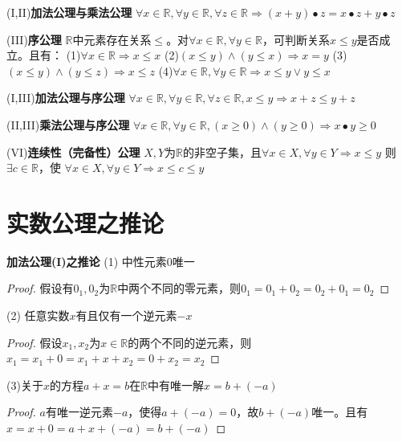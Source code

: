 \documentclass[11pt]{article}
\begin{document}
(I,II)\textbf{加法公理与乘法公理} \newline
$\forall x \in \mathbb{R}, \forall y \in \mathbb{R}, \forall z \in\mathbb{R} \Rightarrow (x+y) \bullet z=x \bullet z+y \bullet z$ \newline

(III)\textbf{序公理} \newline
$\mathbb{R}$中元素存在关系$\le$。对$\forall x \in \mathbb{R}, \forall y \in \mathbb{R}$，可判断关系$x \le y$是否成立。且有：\newline
(1)$\forall x \in \mathbb{R} \Rightarrow x \le x$ \newline
(2)$(x \le y) \land (y \le x) \Rightarrow x=y$ \newline
(3)$(x \le y) \land (y \le z) \Rightarrow x \le z$ \newline
(4)$\forall x \in \mathbb{R}, \forall y \in \mathbb{R} \Rightarrow x \le y \lor y \le x$ \newline

(I,III)\textbf{加法公理与序公理} \newline
$\forall x \in \mathbb{R}, \forall y \in \mathbb{R}, \forall z \in \mathbb{R}, x \le y \Rightarrow x+z \le y+z$ \newline

(II,III)\textbf{乘法公理与序公理} \newline
$\forall x \in \mathbb{R}, \forall y \in \mathbb{R}, (x \ge 0) \land (y \ge 0) \Rightarrow x \bullet y \ge 0$ \newline

(VI)\textbf{连续性（完备性）公理} \newline
$X, Y$为$\mathbb{R}$的非空子集，且$\forall x \in X, \forall y \in Y \Rightarrow x \le y$
则$\exists c \in \mathbb{R}$，使 \newline
$\forall x \in X, \forall y \in Y \Rightarrow x \le c \le y$ \newline

\section{实数公理之推论}
\textbf{加法公理(I)之推论} \newline
(1) 中性元素$0$唯一 \newline
\begin{proof}
  假设有$0_1, 0_2$为$\mathbb{R}$中两个不同的零元素，则$0_1=0_1+0_2=0_2+0_1=0_2$  
\end{proof}
(2) 任意实数$x$有且仅有一个逆元素$-x$ \newline
\begin{proof}
  假设$x_1, x_2$为$x \in \mathbb{R}$的两个不同的逆元素，则$x_1=x_1+0=x_1+x+x_2=0+x_2=x_2$
\end{proof}
(3)关于$x$的方程$a+x=b$在$\mathbb{R}$中有唯一解$x=b+(-a)$ \newline
\begin{proof}
  $a$有唯一逆元素$-a$，使得$a+(-a)=0$，故$b+(-a)$唯一。且有$x=x+0=a+x+(-a)=b+(-a)$
\end{proof}
\end{document}
